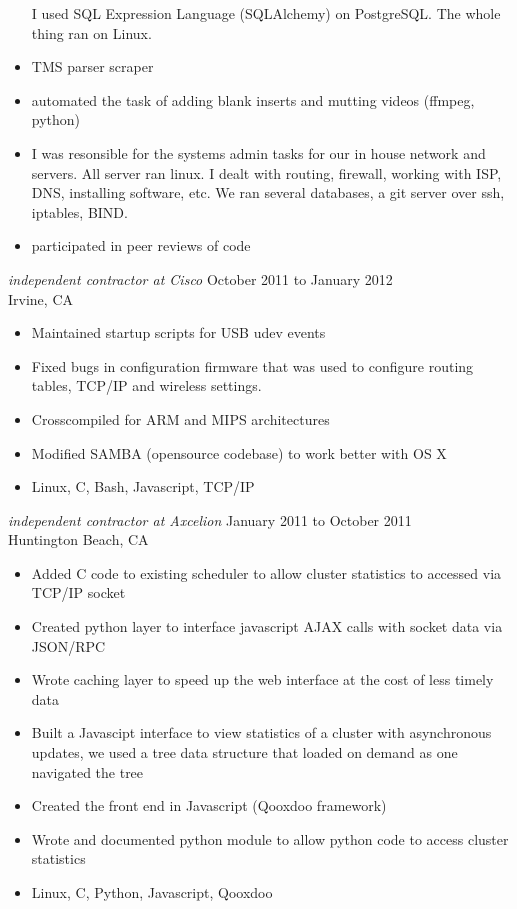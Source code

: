 \documentclass{res}
\begin{document}
\begin{resume}
\begin{itemize}
I used SQL Expression Language (SQLAlchemy) on PostgreSQL.  The whole
thing ran on Linux.
\item TMS parser scraper

\item automated the task of adding blank inserts and mutting
videos (ffmpeg, python)
\item I was resonsible for the systems admin tasks for our in house
network and servers.  All server ran linux.  I dealt with routing,
firewall, working with ISP, DNS,
installing software, etc.  We ran several databases, a git server over ssh,
iptables, BIND.
\item participated in peer reviews of code
\end{itemize}


{\sl independent contractor at Cisco} \hfill October 2011 to January 2012\\
Irvine, CA 
\begin{itemize}
\item Maintained startup scripts for USB udev events
\item Fixed bugs in configuration firmware that was used to configure
 routing tables, TCP/IP and  wireless settings.
\item Crosscompiled for ARM and MIPS architectures
\item Modified SAMBA (opensource codebase) to work better with OS X
\item Linux, C, Bash, Javascript, TCP/IP
\end{itemize}

{\sl independent contractor at Axcelion} \hfill January 2011 to October 2011\\
Huntington Beach, CA 
\begin{itemize}
\item Added  C code to existing scheduler to allow cluster statistics to
accessed via TCP/IP socket
\item Created python layer to interface javascript AJAX calls with
socket data via JSON/RPC
\item Wrote caching layer to speed up the web interface at the cost of
less timely data
\item Built a Javascipt interface to view statistics of a cluster with
asynchronous updates, we used a tree data structure that loaded on
demand as one navigated the tree
\item Created the front end in Javascript (Qooxdoo framework)
\item Wrote and documented python module to allow python code to
access cluster statistics
\item Linux, C, Python, Javascript, Qooxdoo
\end{itemize}


\end{resume}
\end{document}
